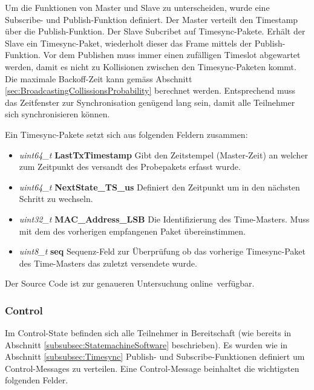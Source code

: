 Um die Funktionen von Master und Slave zu unterscheiden, wurde eine Subscribe- und Publish-Funktion definiert. Der Master verteilt den Timestamp über die Publish-Funktion. Der Slave Subcribet auf Timesync-Pakete. Erhält der Slave ein Timesync-Paket, wiederholt dieser das Frame mittels der Publish-Funktion. Vor dem Publishen muss immer einen zufälligen Timeslot abgewartet werden, damit es nicht zu Kollisionen zwischen den Timesync-Paketen kommt. Die maximale Backoff-Zeit kann gemäss Abschnitt \ref{sec:BroadcastingCollissionsProbability} berechnet werden. Entsprechend muss das Zeitfenster zur Synchronisation genügend lang sein, damit alle Teilnehmer sich synchronisieren können.

Ein Timesync-Pakete setzt sich aus folgenden Feldern zusammen: 

\begin{itemize}
	\item \textit{uint64\_t} \textbf{LastTxTimestamp} Gibt den Zeitstempel (Master-Zeit) an welcher zum Zeitpunkt des versandt des Probepakets erfasst wurde. \\
	\item \textit{uint64\_t} \textbf{NextState\_TS\_us} Definiert den Zeitpunkt um in den nächsten Schritt zu wechseln.\\
	\item \textit{uint32\_t} \textbf{MAC\_Address\_LSB} Die Identifizierung des Time-Masters. Muss mit dem des vorherigen empfangenen Paket übereinstimmen. \\
	\item \textit{uint8\_t} \textbf{seq} Sequenz-Feld zur Überprüfung ob das vorherige Timesync-Paket des Time-Masters das zuletzt versendete wurde. \\
\end{itemize}

Der Source Code ist zur genaueren Untersuchung online\footnotemark\ verfügbar. 


\subsubsection{Control}\label{subsubsec:Control}

Im Control-State befinden sich alle Teilnehmer in Bereitschaft (wie bereits in Abschnitt \ref{subsubsec:StatemachineSoftware} beschrieben). Es wurden wie in Abschnitt \ref{subsubsec:Timesync} Publish- und Subscribe-Funktionen definiert um Control-Messages zu verteilen. Eine Control-Message beinhaltet die wichtigsten folgenden Felder.


